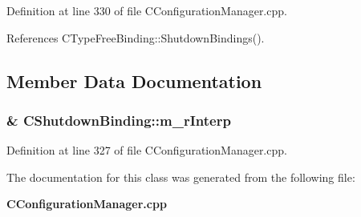 Definition at line 330 of file CConfiguration\-Manager.cpp.

References CType\-Free\-Binding::Shutdown\-Bindings().

\subsection{Member Data Documentation}
\subsubsection{\& CShutdown\-Binding::m\_\-r\-Interp\hspace{0.3cm}{\tt  [private]}}\label{classCShutdownBinding_o0}




Definition at line 327 of file CConfiguration\-Manager.cpp.

The documentation for this class was generated from the following file:\begin{CompactItemize}
\item 
{\bf CConfiguration\-Manager.cpp}\end{CompactItemize}
